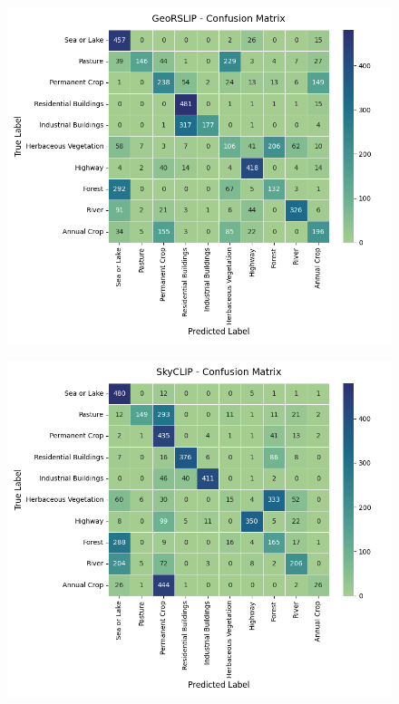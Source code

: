 \documentclass[a4paper, twoside, english]{sapthesis} %
\begin{document}
\begin{minipage}{\textwidth}
    \medskip

    \begin{subfigure}[t]{0.48\textwidth}
      \centering
      \includegraphics[width=\linewidth]{img/EuroSAT_GeoRSCLIP_32_cm.png}
    \end{subfigure}
    \hfill
    \begin{subfigure}[t]{0.48\textwidth}
      \centering
      \includegraphics[width=\linewidth]{img/EuroSAT_SkyCLIP_32_cm.png}
    \end{subfigure}

    \label{fig:eurosatbaselinescm}
\end{minipage}
\end{document}
